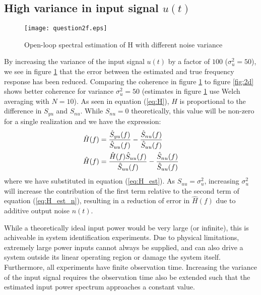 \documentclass[11pt,a4paper]{article}
\begin{document}
\subsection{High variance in input signal $u(t)$}
\begin{figure}
    \begin{center}
        \texttt{[image: question2f.eps]}
    \end{center}
    \caption{Open-loop spectral estimation of H with different noise variance}
    \label{fig:2f}
\end{figure}
By increasing the variance of the input signal $u(t)$ by a factor of $100$
($\sigma_u^2 = 50$), we see in figure \ref{fig:2f} that the error between the
estimated and true frequency response has been reduced. Comparing the coherence
in figure \ref{fig:2f} to figure \ref{fig:2d} shows better coherence for
variance $\sigma_u^2 = 50$ (estimates in figure \ref{fig:2f} use Welch
averaging with $N = 10$). As seen in equation (\ref{eq:H}), $H$ is proportional
to the difference in $S_{yu}$ and $S_{nu}$. While $S_{nu} = 0$ theoretically,
this value will be non-zero for a single realization and we have the
expression:
\begin{align}
    \hat{H}(f) &= \frac{\hat{S}_{yu}(f)}{\hat{S}_{uu}(f)}  -
    \frac{\hat{S}_{nu}(f)}{\hat{S}_{uu}(f)} \notag\\
    \hat{H}(f) &= \frac{\hat{H}(f)\hat{S}_{uu}(f)}{\hat{S}_{uu}(f)}  -
    \frac{\hat{S}_{nu}(f)}{\hat{S}_{uu}(f)}
    \label{eq:H_est_n}
\end{align}
where we have substituted in equation (\ref{eq:H_est}). As $S_{uu} =
\sigma_u^2$, increasing $\sigma_u^2$ will increase the contribution of the
first term relative to the second term of equation (\ref{eq:H_est_n}),
resulting in a reduction of error in $\hat{H}(f)$ due to additive output noise
$n(t)$.

While a theoretically ideal input power would be very large (or infinite), this
is achiveable in system identification experiments. Due to physical
limitations, extremely large power inputs cannot always be supplied, and can
also drive a system outside its linear operating region or damage the system
itself. Furthermore, all experiments have finite observation time. Increasing
the variance of the input signal requires the observation time also be extended
such that the estimated input power spectrum approaches a constant value.


\end{document}
